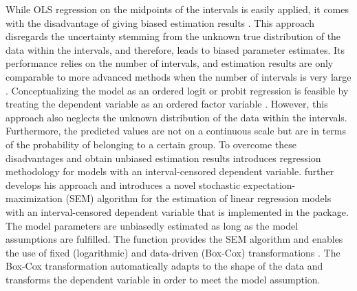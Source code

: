 While OLS regression on the midpoints of the intervals is easily applied, it comes with the disadvantage of giving biased estimation results \citep{Cam87}. This approach disregards the uncertainty stemming from the unknown true distribution of the data within the intervals, and therefore, leads to biased parameter estimates. Its performance relies on the number of intervals, and estimation results are only comparable to more advanced methods when the number of intervals is very large \citep{Fry72}. Conceptualizing the model as an ordered logit or probit regression is feasible by treating the dependent variable as an ordered factor variable \citep{McC80}. However, this approach also neglects the unknown distribution of the data within the intervals. Furthermore, the predicted values are not on a continuous scale but are in terms of the probability of belonging to a certain group. To overcome these disadvantages and obtain unbiased estimation results \citet{Ste83} introduces regression methodology for models with an interval-censored dependent variable. \cite{Wal19} further develops his approach and introduces a novel stochastic expectation-maximization (SEM) algorithm for the estimation of linear regression models with an interval-censored dependent variable that is implemented in the  package. The model parameters are unbiasedly estimated as long as the model assumptions are fulfilled. The function  provides the SEM algorithm and enables the use of fixed (logarithmic) and data-driven (Box-Cox) transformations \citep{Box64}. The Box-Cox transformation automatically adapts to the shape of the data and transforms the dependent variable in order to meet the model assumption.

